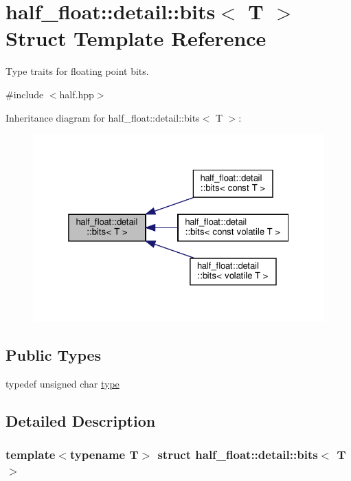 \hypertarget{structhalf__float_1_1detail_1_1bits}{}\section{half\+\_\+float\+:\+:detail\+:\+:bits$<$ T $>$ Struct Template Reference}
\label{structhalf__float_1_1detail_1_1bits}


Type traits for floating point bits.  




{\ttfamily \#include $<$half.\+hpp$>$}



Inheritance diagram for half\+\_\+float\+:\+:detail\+:\+:bits$<$ T $>$\+:
\nopagebreak
\begin{figure}[H]
\begin{center}
\leavevmode
\includegraphics[width=325pt]{structhalf__float_1_1detail_1_1bits__inherit__graph}
\end{center}
\end{figure}
\subsection*{Public Types}
\begin{DoxyCompactItemize}
\item 
typedef unsigned char \hyperlink{structhalf__float_1_1detail_1_1bits_a6087f39bed27f25b3be91078a4a6dbdc}{type}
\end{DoxyCompactItemize}


\subsection{Detailed Description}
\subsubsection*{template$<$typename T$>$\newline
struct half\+\_\+float\+::detail\+::bits$<$ T $>$}

